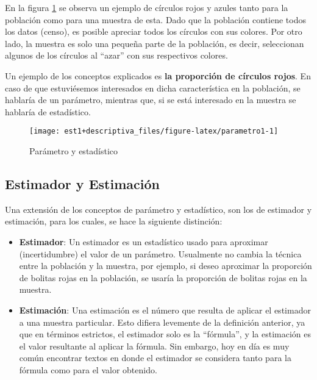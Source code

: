 \documentclass[
]{book}
\begin{document}
En la figura \ref{fig:parametro1} se observa un ejemplo de círculos rojos y azules tanto para la población como para una muestra de esta. Dado que la población contiene todos los datos (censo), es posible apreciar todos los círculos con sus colores. Por otro lado, la muestra es solo una pequeña parte de la población, es decir, seleccionan algunos de los círculos al ``azar'' con sus respectivos colores.

Un ejemplo de los conceptos explicados es \textbf{la proporción de círculos rojos}. En caso de que estuviésemos interesados en dicha característica en la población, se hablaría de un parámetro, mientras que, si se está interesado en la muestra se hablaría de estadístico.

\begin{figure}

{\centering \texttt{[image: est1+descriptiva\_files/figure-latex/parametro1-1]} 

}

\caption{Parámetro y estadístico}\label{fig:parametro1}
\end{figure}

\hypertarget{estimador-y-estimaciuxf3n}{%
\subsection{Estimador y Estimación}\label{estimador-y-estimaciuxf3n}}

Una extensión de los conceptos de parámetro y estadístico, son los de estimador y estimación, para los cuales, se hace la siguiente distinción:

\begin{itemize}
\item
  \textbf{Estimador}: Un estimador es un estadístico usado para aproximar (incertidumbre) el valor de un parámetro. Usualmente no cambia la técnica entre la población y la muestra, por ejemplo, si deseo aproximar la proporción de bolitas rojas en la población, se usaría la proporción de bolitas rojas en la muestra.
\item
  \textbf{Estimación}: Una estimación es el número que resulta de aplicar el estimador a una muestra particular. Esto difiera levemente de la definición anterior, ya que en términos estrictos, el estimador solo es la ``fórmula'', y la estimación es el valor resultante al aplicar la fórmula. Sin embargo, hoy en día es muy común encontrar textos en donde el estimador se considera tanto para la fórmula como para el valor obtenido.
\end{itemize}
\end{document}
